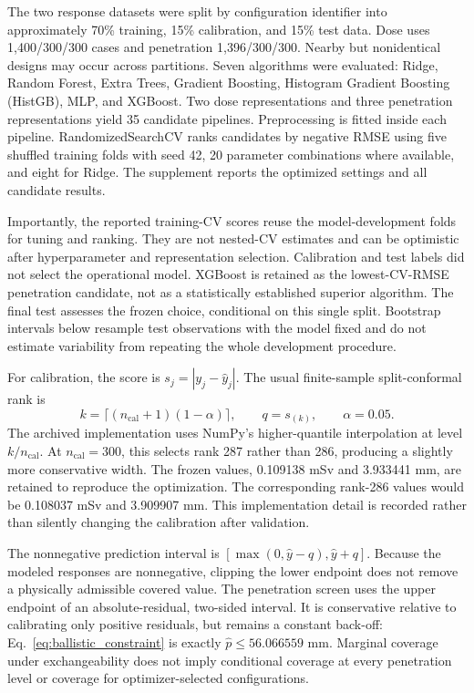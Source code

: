 The two response datasets were split by configuration identifier into approximately 70\% training, 15\% calibration, and 15\% test data. Dose uses 1,400/300/300 cases and penetration 1,396/300/300. Nearby but nonidentical designs may occur across partitions. Seven algorithms were evaluated: Ridge, Random Forest, Extra Trees, Gradient Boosting, Histogram Gradient Boosting (HistGB), MLP, and XGBoost. Two dose representations and three penetration representations yield 35 candidate pipelines. Preprocessing is fitted inside each pipeline. RandomizedSearchCV ranks candidates by negative RMSE using five shuffled training folds with seed 42, 20 parameter combinations where available, and eight for Ridge. The supplement reports the optimized settings and all candidate results.

Importantly, the reported training-CV scores reuse the model-development folds for tuning and ranking. They are not nested-CV estimates and can be optimistic after hyperparameter and representation selection. Calibration and test labels did not select the operational model. XGBoost is retained as the lowest-CV-RMSE penetration candidate, not as a statistically established superior algorithm. The final test assesses the frozen choice, conditional on this single split. Bootstrap intervals below resample test observations with the model fixed and do not estimate variability from repeating the whole development procedure.

For calibration, the score is $s_j=|y_j-\widehat y_j|$. The usual finite-sample split-conformal rank is
\begin{equation}
k=\lceil(n_{\mathrm{cal}}+1)(1-\alpha)\rceil,\qquad q=s_{(k)},\qquad\alpha=0.05.\label{eq:conformal}
\end{equation}
The archived implementation uses NumPy's higher-quantile interpolation at level $k/n_{\mathrm{cal}}$. At $n_{\mathrm{cal}}=300$, this selects rank 287 rather than 286, producing a slightly more conservative width. The frozen values, 0.109138 mSv and 3.933441 mm, are retained to reproduce the optimization. The corresponding rank-286 values would be 0.108037 mSv and 3.909907 mm. This implementation detail is recorded rather than silently changing the calibration after validation.

The nonnegative prediction interval is $[\max(0,\widehat y-q),\widehat y+q]$. Because the modeled responses are nonnegative, clipping the lower endpoint does not remove a physically admissible covered value. The penetration screen uses the upper endpoint of an absolute-residual, two-sided interval. It is conservative relative to calibrating only positive residuals, but remains a constant back-off: Eq.~\eqref{eq:ballistic_constraint} is exactly $\widehat p\leq56.066559$ mm. Marginal coverage under exchangeability does not imply conditional coverage at every penetration level or coverage for optimizer-selected configurations.

